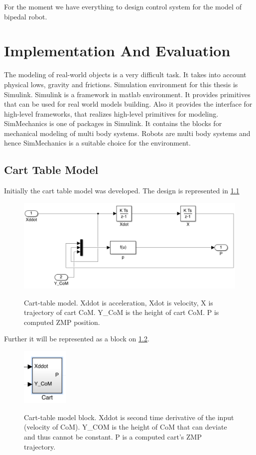 \documentclass[12pt,a4paper]{report}
\begin{document}
			For the moment we have everything to design control system for the model of bipedal robot.
	\chapter{Implementation And Evaluation}
		The modeling of real-world objects is a very difficult task. It takes into account physical lows, gravity and frictions. Simulation environment for this thesis is Simulink.  Simulink is a framework in matlab environment. It provides primitives that can be used for real world models building. Also it provides the interface for high-level frameworks, that realizes high-level primitives for modeling. SimMechanics is one of packages in Simulink. It contains the blocks for mechanical modeling of multi body systems.  Robots are multi body systems and hence SimMechanics is a suitable choice for the environment.
		
		\section{Cart Table Model}
			Initially the cart table model was developed. The design is represented in \cref{fig:13}
			\begin{figure}[H]
				\vspace{-0.2cm}
				\centering
				{\includegraphics[width=1\textwidth]{13}}
				\caption{Cart-table model. Xddot is acceleration, Xdot is velocity, X is trajectory of cart CoM. Y\_CoM is the height of cart CoM. P is computed ZMP position.}
				\label{fig:13}
				\vspace{-0.1cm}
			\end{figure}
			
			Further it will be represented as a block on \cref{fig:14}.
			
			\begin{figure}[H]
				\vspace{-0.2cm}
				\centering
				{\includegraphics[width=0.2\textwidth]{14}}
				\caption{Cart-table model block. Xddot is second time derivative of the input (velocity of CoM). Y\_COM is the height of CoM that can deviate and thus cannot be constant. P is a computed cart's ZMP trajectory.}
				\label{fig:14}
				\vspace{-0.1cm}
			\end{figure}
			
\end{document}
